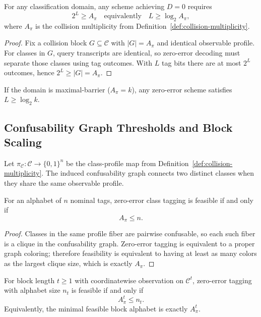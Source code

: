 \begin{theorem}[Converse]\label{thm:converse}
For any classification domain, any scheme achieving $D=0$ requires
\[
2^L \ge A_\pi
\quad\text{equivalently}\quad
L \ge \log_2 A_\pi,
\]
where $A_\pi$ is the collision multiplicity from Definition~\ref{def:collision-multiplicity}.
\end{theorem}

\begin{proof}
Fix a collision block $G \subseteq \mathcal{C}$ with $|G|=A_\pi$ and identical observable profile. For classes in $G$, query transcripts are identical, so zero-error decoding must separate those classes using tag outcomes. With $L$ tag bits there are at most $2^L$ outcomes, hence $2^L \ge |G| = A_\pi$.
\end{proof}

\begin{corollary}
\label{cor:max-barrier-converse}
If the domain is maximal-barrier ($A_\pi = k$), any zero-error scheme satisfies $L \ge \log_2 k$.
\end{corollary}

\subsection{Confusability Graph Thresholds and Block Scaling}

Let $\pi_{\mathcal{C}} : \mathcal{C} \to \{0,1\}^n$ be the class-profile map from Definition~\ref{def:collision-multiplicity}. The induced confusability graph connects two distinct classes when they share the same observable profile.

\begin{theorem}
\label{thm:graph-one-shot-threshold}
For an alphabet of $n$ nominal tags, zero-error class tagging is feasible if and only if
\[
A_\pi \le n.
\]
\end{theorem}

\begin{proof}
Classes in the same profile fiber are pairwise confusable, so each such fiber is a clique in the confusability graph. Zero-error tagging is equivalent to a proper graph coloring; therefore feasibility is equivalent to having at least as many colors as the largest clique size, which is exactly $A_\pi$.
\end{proof}

\begin{theorem}
\label{thm:graph-block-threshold}
For block length $t\ge 1$ with coordinatewise observation on $\mathcal{C}^t$, zero-error tagging with alphabet size $n_t$ is feasible if and only if
\[
A_\pi^t \le n_t.
\]
Equivalently, the minimal feasible block alphabet is exactly $A_\pi^t$.
\end{theorem}

